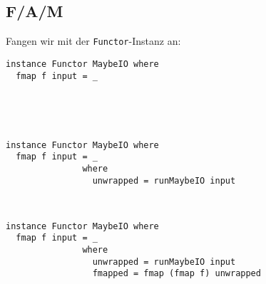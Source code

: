 \documentclass{beamer}
\begin{document}
\subsection{F/A/M}
\begin{frame}[fragile]
Fangen wir mit der \texttt{Functor}-Instanz an:
\begin{overprint}
\begin{verbatim}
instance Functor MaybeIO where
  fmap f input = _

  
  
                 
\end{verbatim}
\begin{verbatim}
instance Functor MaybeIO where
  fmap f input = _
               where
                 unwrapped = runMaybeIO input

                 
\end{verbatim}
\begin{verbatim}
instance Functor MaybeIO where
  fmap f input = _
               where
                 unwrapped = runMaybeIO input
                 fmapped = fmap (fmap f) unwrapped


\end{verbatim}
\end{overprint}
\end{frame}
\end{document}
